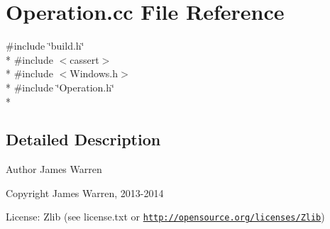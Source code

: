 \section{Operation.\-cc File Reference}
\label{_operation_8cc}
{\ttfamily \#include \char`\"{}build.\-h\char`\"{}}\\*
{\ttfamily \#include $<$cassert$>$}\\*
{\ttfamily \#include $<$Windows.\-h$>$}\\*
{\ttfamily \#include \char`\"{}Operation.\-h\char`\"{}}\\*


\subsection{Detailed Description}
\begin{DoxyAuthor}{Author}
James Warren 
\end{DoxyAuthor}
\begin{DoxyCopyright}{Copyright}
James Warren, 2013-\/2014 
\end{DoxyCopyright}
\begin{DoxyParagraph}{License\-:}
Zlib (see license.\-txt or \href{http://opensource.org/licenses/Zlib}{\tt http\-://opensource.\-org/licenses/\-Zlib}) 
\end{DoxyParagraph}
